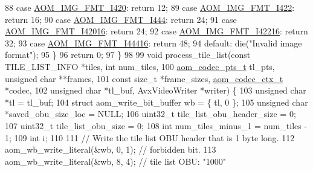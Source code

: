 \begin{DoxyCodeInclude}
{88     \textcolor{keywordflow}{case} \hyperlink{aom__image_8h_a930317c04b4bd0a660bb5e744055523cabd778a3d697463e89d12a1117f417b60}{AOM\_IMG\_FMT\_I420}: \textcolor{keywordflow}{return} 12;
89     \textcolor{keywordflow}{case} \hyperlink{aom__image_8h_a930317c04b4bd0a660bb5e744055523cab2f75281e94ebc0f0bc728ef287cd3e8}{AOM\_IMG\_FMT\_I422}: \textcolor{keywordflow}{return} 16;
90     \textcolor{keywordflow}{case} \hyperlink{aom__image_8h_a930317c04b4bd0a660bb5e744055523ca89d423506e948ab7d3b98b5750b92655}{AOM\_IMG\_FMT\_I444}: \textcolor{keywordflow}{return} 24;
91     \textcolor{keywordflow}{case} \hyperlink{aom__image_8h_a930317c04b4bd0a660bb5e744055523ca20a9cf30277260685642b4cfb4e9273b}{AOM\_IMG\_FMT\_I42016}: \textcolor{keywordflow}{return} 24;
92     \textcolor{keywordflow}{case} \hyperlink{aom__image_8h_a930317c04b4bd0a660bb5e744055523ca064683ed4260fc6244af6cfc9d261c22}{AOM\_IMG\_FMT\_I42216}: \textcolor{keywordflow}{return} 32;
93     \textcolor{keywordflow}{case} \hyperlink{aom__image_8h_a930317c04b4bd0a660bb5e744055523cab9b93d397dedbdd6bfafec84d1f8f0f5}{AOM\_IMG\_FMT\_I44416}: \textcolor{keywordflow}{return} 48;
94     \textcolor{keywordflow}{default}: die(\textcolor{stringliteral}{"Invalid image format"});
95   \}
96   \textcolor{keywordflow}{return} 0;
97 \}
98 
99 \textcolor{keywordtype}{void} process\_tile\_list(\textcolor{keyword}{const} TILE\_LIST\_INFO *tiles, \textcolor{keywordtype}{int} num\_tiles,
100                        \hyperlink{group__encoder_ga958524226c9a65251c9e4f7bb78fc606}{aom\_codec\_pts\_t} tl\_pts, \textcolor{keywordtype}{unsigned} \textcolor{keywordtype}{char} **frames,
101                        \textcolor{keyword}{const} \textcolor{keywordtype}{size\_t} *frame\_sizes, \hyperlink{structaom__codec__ctx}{aom\_codec\_ctx\_t} *codec,
102                        \textcolor{keywordtype}{unsigned} \textcolor{keywordtype}{char} *tl\_buf, AvxVideoWriter *writer) \{
103   \textcolor{keywordtype}{unsigned} \textcolor{keywordtype}{char} *tl = tl\_buf;
104   \textcolor{keyword}{struct }aom\_write\_bit\_buffer wb = \{ tl, 0 \};
105   \textcolor{keywordtype}{unsigned} \textcolor{keywordtype}{char} *saved\_obu\_size\_loc = NULL;
106   uint32\_t tile\_list\_obu\_header\_size = 0;
107   uint32\_t tile\_list\_obu\_size = 0;
108   \textcolor{keywordtype}{int} num\_tiles\_minus\_1 = num\_tiles - 1;
109   \textcolor{keywordtype}{int} i;
110 
111   \textcolor{comment}{// Write the tile list OBU header that is 1 byte long.}
112   aom\_wb\_write\_literal(&wb, 0, 1);  \textcolor{comment}{// forbidden bit.}
113   aom\_wb\_write\_literal(&wb, 8, 4);  \textcolor{comment}{// tile list OBU: "1000"}
}
\end{DoxyCodeInclude}

